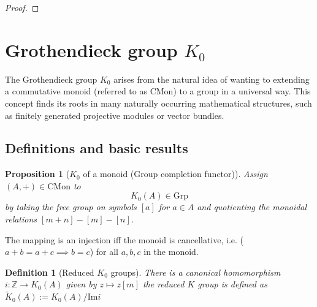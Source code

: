\documentclass[12pt]{article}
\numberwithin{equation}{section}
\newcommand{\Z}{\mathbb{Z}}
\newcommand{\image}{{\mathrm{Im}}}
\newcounter{dummy} \numberwithin{dummy}{section}
\newtheorem{definition}[dummy]{Definition}
\newtheorem{proposition}[dummy]{Proposition}
\begin{document}
\begin{proof}
	\end{proof}

	
	\section{Grothendieck group $K_0$}
	The Grothendieck group $K_0$ arises from the natural idea of wanting to extending a commutative monoid (referred to as $\mathrm{CMon}$) to a group in a universal way. This concept finds its roots in many naturally occurring mathematical structures, such as finitely generated projective modules or vector bundles. 
	
	
	\subsection{Definitions and basic results}
		
	\begin{proposition}[$K_0$ of a monoid (Group completion functor)]
		Assign $(A,+) \in \mathrm{CMon} $ to \[K_0(A) \in \mathrm{Grp}\] by taking the free group on symbols $[a]$ for $a \in A$ and quotienting the monoidal relations $[m+n]-[m]-[n]$.
	\end{proposition}
	
	The mapping is an injection iff the monoid is cancellative, i.e. ($a+b=a+c \implies b=c$) for all $a,b,c$ in the monoid.
	\begin{definition}[Reduced $K_0$ groups]
	There is a canonical homomorphism $i: \Z \to K_0(A)$ given by $z \mapsto z[m]$ the reduced $K$ group is defined as $\tilde{K}_0(A):=K_0(A)/\image i $
	\end{definition}
	
	
\end{document}
